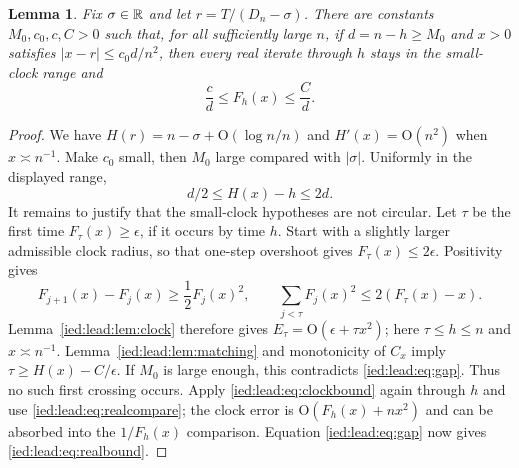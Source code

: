 \documentclass[11pt,letterpaper]{article}
\newtheorem{lemma}[theorem]{Lemma}
\theoremstyle{remark}\newtheorem{remark}[theorem]{Remark}
\newcommand{\Oh}{\mathrm O}\newcommand{\supp}{\operatorname{supp}}
\begin{document}
\begin{lemma}\label{ied:lead:lem:real}
Fix $\sigma\in\mathbb R$ and let $r=T/(D_n-\sigma)$. There are constants $M_0,c_0,c,C>0$ such that, for all sufficiently large $n$, if $d=n-h\ge M_0$ and $x>0$ satisfies $|x-r|\le c_0d/n^2$, then every real iterate through $h$ stays in the small-clock range and
\begin{equation}\label{ied:lead:eq:realbound}
 \frac cd\le F_h(x)\le\frac Cd.
\end{equation}
\end{lemma}
\begin{proof}
We have $H(r)=n-\sigma+\Oh(\log n/n)$ and $H'(x)=\Oh(n^2)$ when $x\asymp n^{-1}$. Make $c_0$ small, then $M_0$ large compared with $|\sigma|$. Uniformly in the displayed range,
\begin{equation}\label{ied:lead:eq:gap}
 d/2\le H(x)-h\le2d.
\end{equation}
It remains to justify that the small-clock hypotheses are not circular. Let $\tau$ be the first time $F_\tau(x)\ge\epsilon$, if it occurs by time $h$. Start with a slightly larger admissible clock radius, so that one-step overshoot gives $F_\tau(x)\le2\epsilon$. Positivity gives
\[
 F_{j+1}(x)-F_j(x)\ge\frac12F_j(x)^2,
 \qquad \sum_{j<\tau}F_j(x)^2\le2(F_\tau(x)-x).
\]
Lemma~\ref{ied:lead:lem:clock} therefore gives $E_\tau=\Oh(\epsilon+\tau x^2)$; here $\tau\le h\le n$ and $x\asymp n^{-1}$. Lemma~\ref{ied:lead:lem:matching} and monotonicity of $C_x$ imply
$\tau\ge H(x)-C/\epsilon$. If $M_0$ is large enough, this contradicts \eqref{ied:lead:eq:gap}. Thus no such first crossing occurs. Apply \eqref{ied:lead:eq:clockbound} again through $h$ and use \eqref{ied:lead:eq:realcompare}; the clock error is $\Oh(F_h(x)+nx^2)$ and can be absorbed into the $1/F_h(x)$ comparison. Equation \eqref{ied:lead:eq:gap} now gives \eqref{ied:lead:eq:realbound}.
\end{proof}
\end{document}
